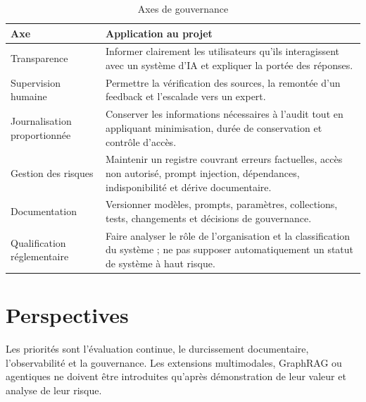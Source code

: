 \begin{table}[H]
\centering
\caption{Axes de gouvernance}
\label{tab:governance_ch8}
\begin{tabular}{p{3.5cm}p{10.0cm}}
\toprule
\textbf{Axe} & \textbf{Application au projet} \\
\midrule
Transparence & Informer clairement les utilisateurs qu’ils interagissent avec un système d’IA et expliquer la portée des réponses. \\
Supervision humaine & Permettre la vérification des sources, la remontée d’un feedback et l’escalade vers un expert. \\
Journalisation proportionnée & Conserver les informations nécessaires à l’audit tout en appliquant minimisation, durée de conservation et contrôle d’accès. \\
Gestion des risques & Maintenir un registre couvrant erreurs factuelles, accès non autorisé, prompt injection, dépendances, indisponibilité et dérive documentaire. \\
Documentation & Versionner modèles, prompts, paramètres, collections, tests, changements et décisions de gouvernance. \\
Qualification réglementaire & Faire analyser le rôle de l’organisation et la classification du système ; ne pas supposer automatiquement un statut de système à haut risque. \\
\bottomrule
\end{tabular}
\end{table}
\section{Perspectives}
Les priorités sont l'évaluation continue, le durcissement documentaire, l'observabilité et la gouvernance. Les extensions multimodales, GraphRAG ou agentiques ne doivent être introduites qu'après démonstration de leur valeur et analyse de leur risque.

